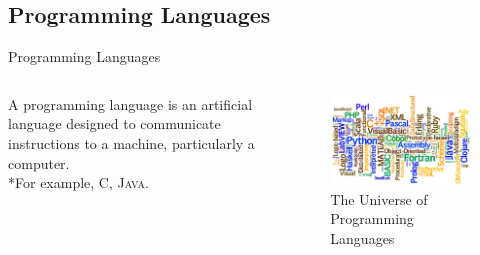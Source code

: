 \documentclass[hideothersubsections, t, aspectratio=1610]{beamer}
\begin{document}
\subsection{Programming Languages}
\begin{frame}{Programming Languages}
\begin{columns}[T]
    \begin{column}{.4\textwidth}
     \begin{block}{}
A programming language is an artificial language designed to communicate instructions to a machine, particularly a computer.
\\*For example, \textsc{C, Java}.
    \end{block}
    \end{column}
    \begin{column}{.6\textwidth}
    \begin{block}{}
\begin{figure}[H]
    \includegraphics[width=1\textwidth]{progLanguages.jpg}
    
    \caption{The Universe of Programming Languages}
 \end{figure}   
    \end{block}
    \end{column}
  \end{columns}
\end{frame}
\end{document}
